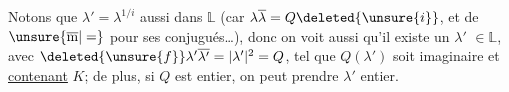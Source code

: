Notons que $\lambda'=\lambda^{1/i}$  aussi dans $\mathbb L$ (car $\lambda\overline\lambda=Q\deleted{\unsure{i}}$, et de $\unsure{\overline{\mathrm m}|=}$ pour ses conjugués\ldots), donc on voit aussi qu'il existe un $\lambda'$  $\in\mathbb L$, avec $\deleted{\unsure{f}}\lambda'\overline{\lambda'}=|\lambda'|^2=Q$, tel que $Q(\lambda')$ soit   imaginaire et \uline{contenant} $K$; de plus, si $Q$ est entier, on peut prendre $\lambda'$ entier.
